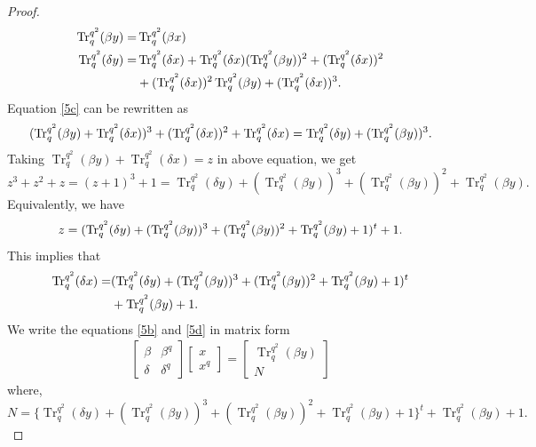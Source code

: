 \documentclass{birkjour}
\theoremstyle{definition}
\theoremstyle{remark}
\numberwithin{equation}{section}
\begin{document}
\begin{proof}
	\begin{align}
		\operatorname{Tr}_q^{q^2}(\beta y)=&\operatorname{Tr}_q^{q^2}(\beta x)\label{5b}\\
		\operatorname{Tr}_q^{q^2}(\delta y)=&\operatorname{Tr}_q^{q^2}(\delta x)+\operatorname{Tr}_q^{q^2}(\delta x)(\operatorname{Tr}_q^{q^2}(\beta y))^2+(\operatorname{Tr}_q^{q^2}(\delta x))^2\notag\\&+(\operatorname{Tr}_q^{q^2}(\delta x))^2\operatorname{Tr}_q^{q^2}(\beta y)+(\operatorname{Tr}_q^{q^2}(\delta x))^3.\label{5c}
	\end{align}
	Equation \ref{5c} can be rewritten as
	\begin{align}
		(\operatorname{Tr}_q^{q^2}(\beta y)+\operatorname{Tr}_q^{q^2}(\delta x))^3+(\operatorname{Tr}_q^{q^2}(\delta x))^2+\operatorname{Tr}_q^{q^2}(\delta x)=\operatorname{Tr}_q^{q^2}(\delta y)+(\operatorname{Tr}_q^{q^2}(\beta y))^3.\notag
	\end{align}
	Taking $\operatorname{Tr}_q^{q^2}(\beta y)+\operatorname{Tr}_q^{q^2}(\delta x)=z$ in above equation, we get
	$$z^3+z^2+z=(z+1)^3+1=\operatorname{Tr}_q^{q^2}(\delta y)+(\operatorname{Tr}_q^{q^2}(\beta y))^3+(\operatorname{Tr}_q^{q^2}(\beta y))^2+\operatorname{Tr}_q^{q^2}(\beta y).$$
	Equivalently, we have
	 $$z=\large(\operatorname{Tr}_q^{q^2}(\delta y)+(\operatorname{Tr}_q^{q^2}(\beta y))^3+(\operatorname{Tr}_q^{q^2}(\beta y))^2+\operatorname{Tr}_q^{q^2}(\beta y)+1\large)^t+1.$$
	This implies that
	\begin{align}
		\operatorname{Tr}_q^{q^2}(\delta x)=&(\operatorname{Tr}_q^{q^2}(\delta y)+(\operatorname{Tr}_q^{q^2}(\beta y))^3+(\operatorname{Tr}_q^{q^2}(\beta y))^2+\operatorname{Tr}_q^{q^2}(\beta y)+1)^t\notag\\&+\operatorname{Tr}_q^{q^2}(\beta y)+1.\label{5d}
	\end{align}
	We write the equations \ref{5b} and \ref{5d} in matrix form 
	\begin{align}\label{5e}
		\begin{bmatrix}
		\beta&\beta^{q}\\
		\delta&\delta^{q}
	\end{bmatrix}
	\begin{bmatrix}
		x\\x^{q}
	\end{bmatrix}=
	\begin{bmatrix}
		\operatorname{Tr}_{q}^{q^2}(\beta y)\\
		N
	\end{bmatrix}\end{align}where,$$N=	\{\operatorname{Tr}_q^{q^2}(\delta y)+(\operatorname{Tr}_q^{q^2}(\beta y))^3+(\operatorname{Tr}_q^{q^2}(\beta y))^2+\operatorname{Tr}_q^{q^2}(\beta y)+1\}^t+\operatorname{Tr}_q^{q^2}(\beta y)+1.$$


\end{proof}
\end{document}
